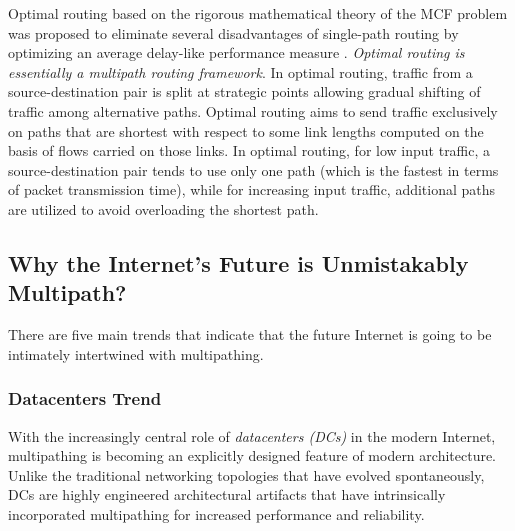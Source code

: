 \documentclass[10pt]{IEEEtran}
\begin{document}
\vspace{2mm}
Optimal routing based on the rigorous mathematical theory of the MCF problem was proposed to eliminate several disadvantages of single-path routing by optimizing an average delay-like performance measure \cite{bertsekas1992data}. \textit{Optimal routing is essentially a multipath routing framework}. In optimal routing, traffic from a source-destination pair is split at strategic points allowing gradual shifting of traffic among alternative paths. Optimal routing aims to send traffic exclusively on paths that are shortest with respect to some link lengths computed on the basis of flows carried on those links. In optimal routing, for low input traffic, a source-destination pair tends to use only one path (which is the fastest in terms of packet transmission time), while for increasing input traffic, additional paths are utilized to avoid overloading the shortest path.

\subsection{Why the Internet's Future is Unmistakably Multipath?}
\label{sec:whyFuture}

There are five main trends that indicate that the future Internet is going to be intimately intertwined with multipathing.

\vspace{1mm}
\subsubsection{Datacenters Trend} With the increasingly central role of \textit{datacenters (DCs)} in the modern Internet, multipathing is becoming an explicitly designed feature of modern architecture. Unlike the traditional networking topologies that have evolved spontaneously, DCs are highly engineered architectural artifacts that have intrinsically incorporated multipathing for increased performance and reliability. 

\vspace{1mm}
\end{document}
